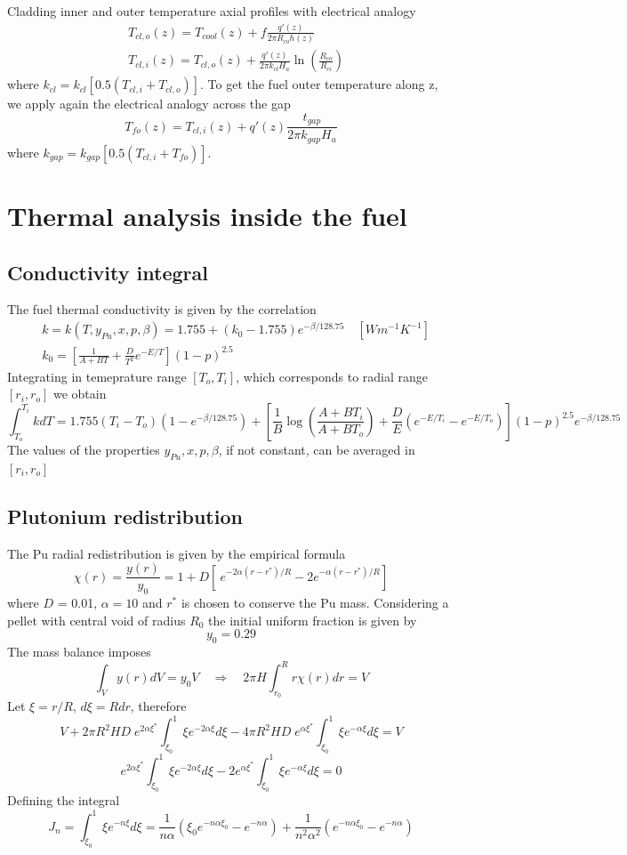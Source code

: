 \documentclass{article}
\begin{document}
Cladding inner and outer temperature axial profiles with electrical analogy
\begin{align*}
  & T_{cl,o}(z) = T_{cool}(z) + f\frac{q'(z)}{2\pi R_{co}h(z)}\\
  & T_{cl,i}(z) = T_{cl,o}(z) + \frac{q'(z)}{2\pi k_{cl}H_a}\ln\left(\frac{R_{co}}{R_{ci}}\right)
\end{align*}
where $k_{cl} = k_{cl}[0.5(T_{cl,i} + T_{cl,o})]$. To get the fuel outer temperature along z, we apply again the electrical analogy across the gap
\[
  T_{fo}(z) = T_{cl,i}(z) + q'(z)\frac{t_{gap}}{2\pi k_{gap}H_a}
\]
where $k_{gap} = k_{gap}[0.5(T_{cl,i} + T_{fo})]$. 

\section{Thermal analysis inside the fuel}
\subsection{Conductivity integral}
The fuel thermal conductivity is given by the correlation 
\begin{align*}
  & k = k(T, y_{Pu}, x, p, \beta) =  1.755 + (k_0 - 1.755)e^{-\beta/128.75} \quad [W m^{-1} K^{-1}]\\
  & k_0 = \left[\frac{1}{A + BT} + \frac{D}{T^2}e^{-E/T} \right](1 - p)^{2.5}
\end{align*}
Integrating in temeprature range \([T_o, T_i]\), which corresponds to radial range \([r_i,r_o]\) we obtain
\[
  \int_{T_o}^{T_i} k dT = 1.755(T_i -  T_o)(1 - e^{-\beta/128.75}) + \left[ \frac{1}{B}\log\left(\frac{A + BT_i}{A + BT_o}\right) + \frac{D}{E}(e^{-E/T_i} - e^{-E/T_o})\right](1-p)^{2.5}e^{-\beta/128.75}
\]
The values of the properties \(y_{Pu}, x, p, \beta\), if not constant, can be averaged in \([r_i,r_o]\)

\subsection{Plutonium redistribution}
The Pu radial redistribution is given by the empirical formula
\begin{equation}
  \chi(r) = \frac{y(r)}{y_0} =  1 + D\left[\ e^{-2\alpha(r - r^*)/R}  - 2e^{-\alpha(r-r^*)/R} \right] 
  \label{eq:radial_red}
\end{equation}
\[
\]
where $D$ = 0.01, $\alpha = 10$ and  $r^*$ is chosen to conserve the Pu mass. Considering a pellet with central void of radius \(R_0\) the initial uniform fraction is given by
\[
  y_0 = 0.29
\]
The mass balance imposes
\[
  \int_V y(r) dV = y_0V \quad \Rightarrow \quad 2\pi H\int_{r_0}^R r \chi(r)dr = V
\]
Let \(\xi = r/R\), \(d\xi = Rdr\), therefore
\[
  V + 2\pi R^2HD\;e^{2\alpha\xi^*}\int_{\xi_0}^1 \xi e^{-2\alpha\xi}d\xi - 4\pi R^2HD\;e^{\alpha\xi^*}\int_{\xi_0}^1 \xi e^{-\alpha\xi}d\xi = V
\]
\[
  e^{2\alpha\xi^*}\int_{\xi_0}^1 \xi e^{-2\alpha\xi}d\xi - 2e^{\alpha\xi^*}\int_{\xi_0}^1 \xi e^{-\alpha\xi}d\xi = 0
\]
Defining the integral
\[
  J_n = \int_{\xi_0}^1 \xi e^{-n\xi}d\xi = \frac{1}{n\alpha}\left( \xi_0e^{-n\alpha\xi_0} - e^{-n\alpha} \right) + \frac{1}{n^2\alpha^2}\left(e^{-n\alpha\xi_0} - e^{-n\alpha} \right)
\]
\end{document}
